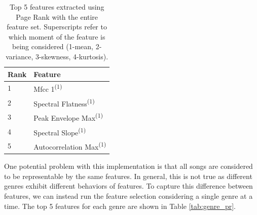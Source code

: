 \documentclass[12pt]{article}
\newcommand{\tss}[1]{\textsuperscript{#1}}
\begin{document}
\begin{table}[!h]
\begin{center}
\begin{tabular}{|l|l|}
\hline
Rank & Feature \\ \hline
1 & Mfcc 1\tss{(1)} \\ \hline
2 & Spectral Flatness\tss{(1)} \\ \hline
3 & Peak Envelope Max\tss{(1)} \\ \hline
4 & Spectral Slope\tss{(1)} \\ \hline
5 & Autocorrelation Max\tss{(1)} \\ \hline
\end{tabular}
\caption{Top 5 features extracted using Page Rank with the entire feature set.  Superscripts refer to which moment of the feature is being considered (1-mean, 2-variance, 3-skewness, 4-kurtosis).}
\label{tab:all_pr}
\end{center}
\end{table}

One potential problem with this implementation is that all songs are considered to be representable by the same features.  In general, this is not true as different genres exhibit different behaviors of features.  To capture this difference between features, we can instead run the feature selection considering a single genre at a time.  The top 5 features for each genre are shown in Table \ref{tab:genre_pr}.
\end{document}
